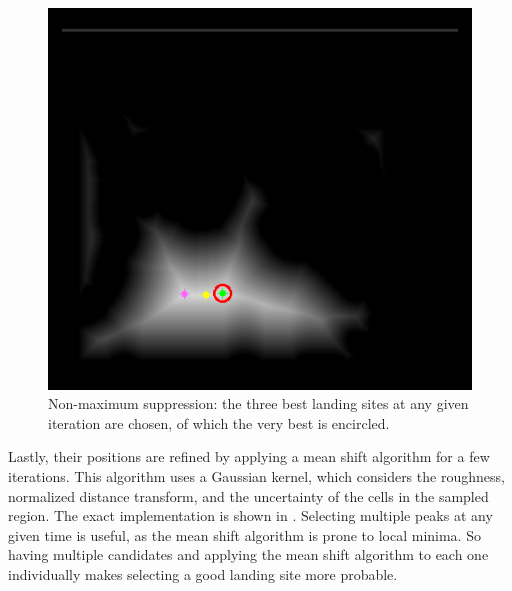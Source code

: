 \begin{figure}[ht!]
    \centering
    \includegraphics[scale=0.5]{images/system_overview/non_max_suppression.png}
    \caption{Non-maximum suppression: the three best landing sites at any given iteration are chosen, of which the very best is encircled.}
    \label{fig:non_max_sup}
\end{figure}

\clearpage %

Lastly, their positions are refined by applying a mean shift algorithm for a few iterations. This algorithm uses a Gaussian kernel, which considers the roughness, normalized distance transform, and the uncertainty of the cells in the sampled region. The exact implementation is shown in \citet{LSD2}. Selecting multiple peaks at any given time is useful, as the mean shift algorithm is prone to local minima. So having multiple candidates and applying the mean shift algorithm to each one individually makes selecting a good landing site more probable.

